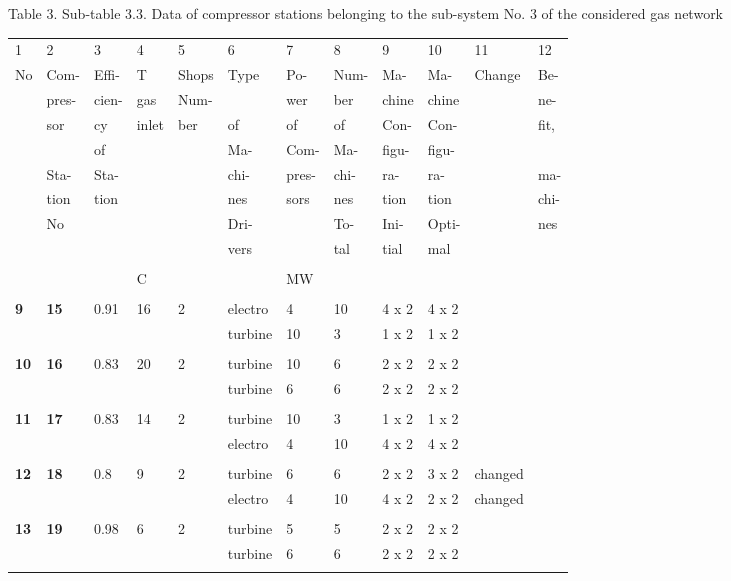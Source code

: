 \documentclass{article}
\begin{document}
\bigskip


\bigskip

\newpage

\bigskip

Table 3. Sub-table 3.3. Data of compressor stations belonging to the
sub-system No. 3 of the considered gas network

\bigskip

\begin{tabular}{llllllllllll}
1 & 2 & 3 & 4 & 5 & 6 & 7 & 8 & 9 & 10 & 11 & 12 \\ 
No & Com- & Effi- & T & Shops & Type & Po- & Num- & Ma- & Ma- & Change & Be-
\\ 
& pres- & cien- & gas & Num- &  & wer & ber & chine & chine &  & ne- \\ 
& sor & cy & inlet & ber & of & of & of & Con- & Con- &  & fit, \\ 
&  & of &  &  & Ma- & Com- & Ma- & figu- & figu- &  &  \\ 
& Sta- & Sta- &  &  & chi- & pres- & chi- & ra- & ra- &  & ma- \\ 
& tion & tion &  &  & nes & sors & nes & tion & tion &  & chi- \\ 
& No &  &  &  & Dri- &  & To- & Ini- & Opti- &  & nes \\ 
&  &  &  &  & vers &  & tal & tial & mal &  &  \\ 
&  &  &  &  &  &  &  &  &  &  &  \\ 
&  &  & C &  &  & MW &  &  &  &  &  \\ 
&  &  &  &  &  &  &  &  &  &  &  \\ 
\textbf{9} & \textbf{15} & 0.91 & 16 & 2 & electro & 4 & 10 & 4 x 2 & 4 x 2
&  &  \\ 
&  &  &  &  & turbine & 10 & 3 & 1 x 2 & 1 x 2 &  &  \\ 
&  &  &  &  &  &  &  &  &  &  &  \\ 
\textbf{10} & \textbf{16} & 0.83 & 20 & 2 & turbine & 10 & 6 & 2 x 2 & 2 x 2
&  &  \\ 
&  &  &  &  & turbine & 6 & 6 & 2 x 2 & 2 x 2 &  &  \\ 
&  &  &  &  &  &  &  &  &  &  &  \\ 
\textbf{11} & \textbf{17} & 0.83 & 14 & 2 & turbine & 10 & 3 & 1 x 2 & 1 x 2
&  &  \\ 
&  &  &  &  & electro & 4 & 10 & 4 x 2 & 4 x 2 &  &  \\ 
&  &  &  &  &  &  &  &  &  &  &  \\ 
\textbf{12} & \textbf{18} & 0.8 & 9 & 2 & turbine & 6 & 6 & 2 x 2 & 3 x 2 & 
changed &  \\ 
&  &  &  &  & electro & 4 & 10 & 4 x 2 & 2 x 2 & changed &  \\ 
&  &  &  &  &  &  &  &  &  &  &  \\ 
\textbf{13} & \textbf{19} & 0.98 & 6 & 2 & turbine & 5 & 5 & 2 x 2 & 2 x 2 & 
&  \\ 
&  &  &  &  & turbine & 6 & 6 & 2 x 2 & 2 x 2 &  &  \\ 
&  &  &  &  &  &  &  &  &  &  & 
\end{tabular}
\end{document}
